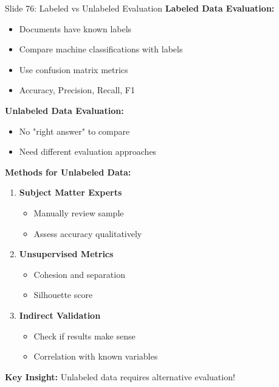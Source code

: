 \documentclass[8pt]{beamer}
\begin{document}
	\begin{frame}{Slide 76: Labeled vs Unlabeled Evaluation}
		\fontsize{6.5}{7.5}\selectfont
		\textbf{Labeled Data Evaluation:}
		\begin{itemize}
			\item Documents have known labels
			\item Compare machine classifications with labels
			\item Use confusion matrix metrics
			\item Accuracy, Precision, Recall, F1
		\end{itemize}
		
		\vspace{0.1cm}
		\textbf{Unlabeled Data Evaluation:}
		\begin{itemize}
			\item No "right answer" to compare
			\item Need different evaluation approaches
		\end{itemize}
		
		\vspace{0.1cm}
		\textbf{Methods for Unlabeled Data:}
		\begin{enumerate}
			\item \textbf{Subject Matter Experts}
			\begin{itemize}
				\item Manually review sample
				\item Assess accuracy qualitatively
			\end{itemize}
			\item \textbf{Unsupervised Metrics}
			\begin{itemize}
				\item Cohesion and separation
				\item Silhouette score
			\end{itemize}
			\item \textbf{Indirect Validation}
			\begin{itemize}
				\item Check if results make sense
				\item Correlation with known variables
			\end{itemize}
		\end{enumerate}
		
		\textcolor{myblue}{\textbf{Key Insight:}} Unlabeled data requires alternative evaluation!
	\end{frame}
	
\end{document}
